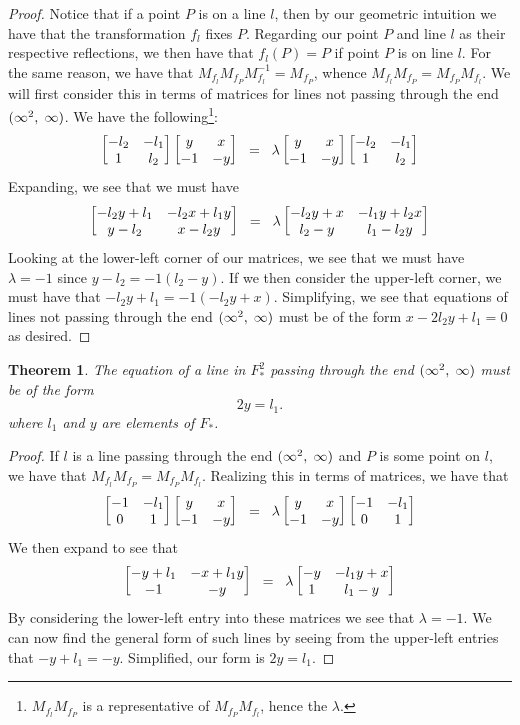 \documentclass[12pt]{article}
\newcommand{\lftmat}[4]{\begin{bmatrix} {#1} & {#2} \\ {#3} & {#4} \end{bmatrix}}
\newcommand{\pointmat}[2]{\lftmat{{#2}}{{#1}}{-1}{-{#2}}}
\newcommand{\stanpointmat}{\pointmat{x}{y}}
\newcommand{\linenoendmat}[2]{\begin{bmatrix} -{#2} & -{#1} \\ 1 & {#2} \end{bmatrix}}
\newcommand{\stanlinenoendmat}{\linenoendmat{l_1}{l_2}}
\newcommand{\lineendmat}[2]{\begin{bmatrix} -1 & -{#1} \\ 0 & 1 \end{bmatrix}}
\newcommand{\stanlineendmat}{\lineendmat{l_1}{l_2}}
\newcommand{\spceq}{\hspace{2mm} = \hspace{2mm}}
\newcommand{\ttc}{, \hspace{1mm}}
\newcommand{\inv}{^{-1}}
\newcommand{\specialend}{(\infty^2\ttc\infty)}
\theoremstyle{plain}
\newtheorem{theorem}{Theorem}[section]
\theoremstyle{definition}
\begin{document}
\begin{proof}
Notice that if a point $P$ is on a line $l$, then by our geometric intuition we have that the transformation $f_l$ fixes $P$. Regarding our point $P$ and line $l$ as their respective reflections, we then have that $f_l(P) = P$ if point $P$ is on line $l$. For the same reason, we have that $M_{f_l} M_{f_P} M_{f_l}\inv = M_{f_P}$, whence $M_{f_l} M_{f_P} = M_{f_P} M_{f_l}$. We will first consider this in terms of matrices for lines not passing through the end $\specialend$. We have the following\footnote{$M_{f_l} M_{f_P}$ is a representative of $M_{f_P} M_{f_l}$, hence the $\lambda$.}:
\begin{equation} 
\stanlinenoendmat\stanpointmat \spceq \lambda \stanpointmat\stanlinenoendmat
\end{equation}	
Expanding, we see that we must have
	\[
		\lftmat{-l_2y+l_1}{-l_2x+l_1y}{y-l_2}{x-l_2y} \spceq \lambda \lftmat{-l_2y+x}{-l_1y+l_2x}{l_2-y}{l_1-l_2y}
	\]
Looking at the lower-left corner of our matrices, we see that we must have $\lambda = -1$ since $y - l_2 = -1(l_2 - y)$. If we then consider the upper-left corner, we must have that $-l_2y + l_1 = -1(-l_2y + x)$. Simplifying, we see that equations of lines not passing through the end $\specialend$ must be of the form $x - 2l_2y + l_1  = 0$ as desired.
\end{proof}

\begin{theorem} The equation of a line in $F_*^2$ passing through the end $\specialend$ must be of the form 
\begin{equation}
	2y = l_1.
\end{equation} 
where $l_1$ and $y$ are elements of $F_*$.
\end{theorem}

\begin{proof} If $l$ is a line passing through the end $\specialend$ and $P$ is some point on $l$, we have that $M_{f_l} M_{f_P} = M_{f_P} M_{f_l}$. Realizing this in terms of matrices, we have that 
\begin{equation} 
	\stanlineendmat\stanpointmat \spceq \lambda \stanpointmat\stanlineendmat
\end{equation}	
We then expand to see that 
	\[
		\lftmat{-y+l_1}{-x+l_1y}{-1}{-y} \spceq \lambda \lftmat{-y}{-l_1y+x}{1}{l_1-y}
	\]
By considering the lower-left entry into these matrices we see that $\lambda = -1$. We can now find the general form of such lines by seeing from the upper-left entries that $-y+l_1 = -y$. Simplified, our form is $2y = l_1$. 
\end{proof}
\end{document}
